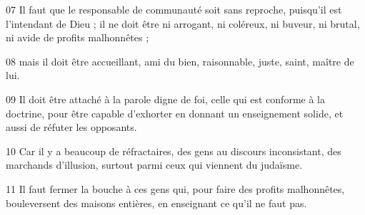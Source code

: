 07 Il faut que le responsable de communauté soit sans reproche, puisqu’il est l’intendant de Dieu ; il ne doit être ni arrogant, ni coléreux, ni buveur, ni brutal, ni avide de profits malhonnêtes ;

08 mais il doit être accueillant, ami du bien, raisonnable, juste, saint, maître de lui.

09 Il doit être attaché à la parole digne de foi, celle qui est conforme à la doctrine, pour être capable d’exhorter en donnant un enseignement solide, et aussi de réfuter les opposants.

10 Car il y a beaucoup de réfractaires, des gens au discours inconsistant, des marchands d’illusion, surtout parmi ceux qui viennent du judaïsme.

11 Il faut fermer la bouche à ces gens qui, pour faire des profits malhonnêtes, bouleversent des maisons entières, en enseignant ce qu’il ne faut pas.